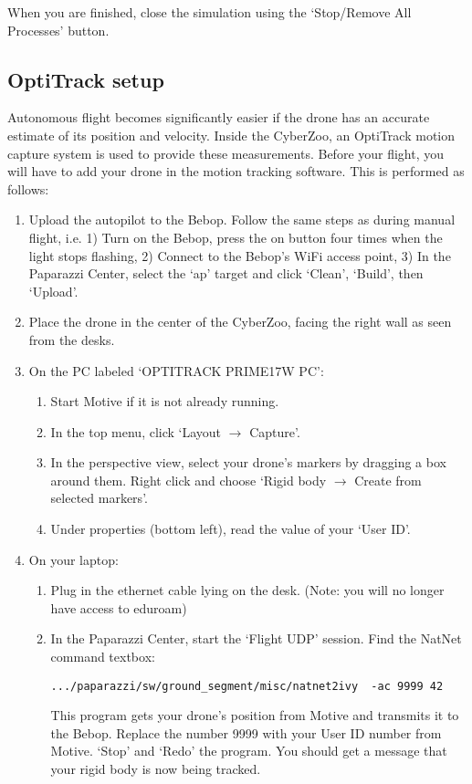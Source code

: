 \documentclass{article}
\begin{document}
\medskip
When you are finished, close the simulation using the `Stop/Remove All Processes' button.


\subsection*{OptiTrack setup}
Autonomous flight becomes significantly easier if the drone has an accurate estimate of its position and velocity. Inside the CyberZoo, an OptiTrack motion capture system is used to provide these measurements. Before your flight, you will have to add your drone in the motion tracking software. This is performed as follows:
\begin{enumerate}
\item Upload the autopilot to the Bebop. Follow the same steps as during manual flight, i.e. 1) Turn on the Bebop, press the on button four times when the light stops flashing, 2) Connect to the Bebop's WiFi access point, 3) In the Paparazzi Center, select the `ap' target and click `Clean', `Build', then `Upload'.
\item Place the drone in the center of the CyberZoo, facing the right wall as seen from the desks.
\item On the PC labeled `OPTITRACK PRIME17W PC':
\begin{enumerate}
\item Start Motive if it is not already running.
\item In the top menu, click `Layout $\rightarrow$ Capture'.
\item In the perspective view, select your drone's markers by dragging a box around them. Right click and choose `Rigid body $\rightarrow$ Create from selected markers'.
\item Under properties (bottom left), read the value of your `User ID'.
\end{enumerate}
\item On your laptop:
\begin{enumerate}
\item Plug in the ethernet cable lying on the desk. (Note: you will no longer have access to eduroam)
\item In the Paparazzi Center, start the `Flight UDP' session. Find the NatNet command textbox:
\begin{verbatim}
.../paparazzi/sw/ground_segment/misc/natnet2ivy  -ac 9999 42
\end{verbatim}
This program gets your drone's position from Motive and transmits it to the Bebop. Replace the number 9999 with your User ID number from Motive. `Stop' and `Redo' the program. You should get a message that your rigid body is now being tracked.\\

\end{enumerate}
\end{enumerate}
\end{document}
